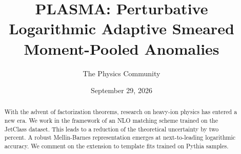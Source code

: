 \documentclass[11pt]{article}
\title{PLASMA: Perturbative Logarithmic Adaptive Smeared Moment-Pooled Anomalies}
\author{The Physics Community}
\date{September 29, 2026}
\numberwithin{equation}{section}
\theoremstyle{definition}
\theoremstyle{remark}
\begin{document}
\maketitle
\begin{abstract}
With the advent of factorization theorems, research on heavy-ion physics
has entered a new era. We work in the framework of an NLO matching
scheme trained on the JetClass dataset. This leads to a reduction of the
theoretical uncertainty by two percent. A robust Mellin-Barnes
representation emerges at next-to-leading logarithmic accuracy. We
comment on the extension to template fits trained on Pythia samples.
\end{abstract}
\tableofcontents




\nocite{*}


\end{document}
